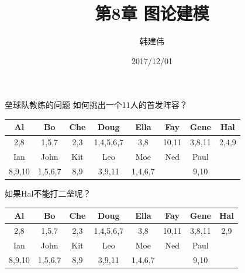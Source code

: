 \documentclass[UTF8]{ctexbeamer}
\title{第8章 图论建模}
\author{韩建伟}
\institute{
  信息学院\\
  \texttt{hanjianwei@zjgsu.edu.cn}
}
\date{2017/12/01}
\begin{document}
\begin{frame}[plain]
  \titlepage{}
\end{frame}

\begin{frame}{垒球队教练的问题}
  如何挑出一个11人的首发阵容？

  \begin{table}
    \centering
    \begin{tabular}{c|c|c|c|c|c|c|c}
      \hline
      Al & Bo & Che & Doug & Ella & Fay & Gene & Hal\\
      \hline
      2,8 & 1,5,7 & 2,3 & 1,4,5,6,7 & 3,8 & 10,11 & 3,8,11 & 2,4,9\\
      \hline
      Ian & John & Kit & Leo & Moe & Ned & Paul & \\
      \hline
      8,9,10 & 1,5,6,7 & 8,9 & 3,9,11 & 1,4,6,7 && 9,10 &\\
      \hline
    \end{tabular}
  \end{table}

  如果Hal不能打二垒呢？

  \begin{table}
    \centering
    \begin{tabular}{c|c|c|c|c|c|c|c}
      \hline
      Al & Bo & Che & Doug & Ella & Fay & Gene & Hal\\
      \hline
      2,8 & 1,5,7 & 2,3 & 1,4,5,6,7 & 3,8 & 10,11 & 3,8,11 & 2,9\\
      \hline
      Ian & John & Kit & Leo & Moe & Ned & Paul & \\
      \hline
      8,9,10 & 1,5,6,7 & 8,9 & 3,9,11 & 1,4,6,7 && 9,10 &\\
      \hline
    \end{tabular}
  \end{table}
  
\end{frame}
\end{document}
